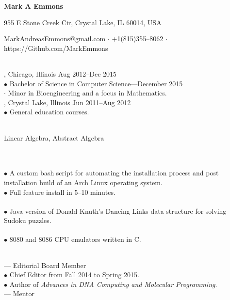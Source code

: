 \documentclass[11pt]{article}
\begin{document}

\centerline{\LARGE \bf Mark A Emmons}
\centerline{955 E Stone Creek Cir, Crystal Lake, IL 60014, USA}
\centerline{MarkAndreasEmmons@gmail.com $\cdot$ +1(815)355--8062 $\cdot$ https://Github.com/MarkEmmons}

 \\
, Chicago, Illinois \hfill Aug 2012--Dec 2015 \\
\indent $\bullet$ Bachelor of Science in Computer Science---December 2015 \\
\indent \indent $\cdot$ Minor in Bioengineering and a focus in Mathematics. \\
, Crystal Lake, Illinois \hfill Jun 2011--Aug 2012 \\
\indent $\bullet$ General education courses.

 \\
\indent Linear Algebra, Abstract Algebra

 \\
 \\
\indent $\bullet$ A custom bash script for automating the installation process and post installation build of an Arch Linux operating system. \\
\indent $\bullet$ Full feature install in 5--10 minutes. \\
 \\
\indent $\bullet$ Java version of Donald Knuth's Dancing Links data structure for solving Sudoku puzzles. \\
 \\
\indent $\bullet$ 8080 and 8086 CPU emulators written in C.

 \\
 --- Editorial Board Member \\
\indent $\bullet$ Chief Editor from Fall 2014 to Spring 2015. \\
\indent $\bullet$ Author of \textit{Advances in DNA Computing and Molecular Programming}. \\
 --- Mentor \\
\end{document}
